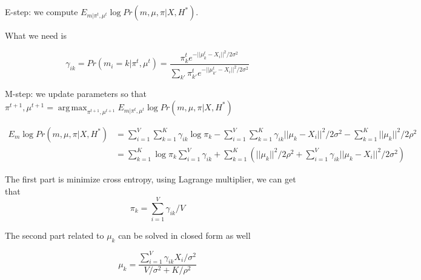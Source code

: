 \documentclass[letterpaper]{article}
\theoremstyle{plain} \numberwithin{equation}{section}
\theoremstyle{definition}
\newcommand{\hyper}{H^*}
\newcommand{\norm}[1]{||#1||^2}
\newcommand{\tsup}[2]{#1^{#2}}
\DeclareMathOperator*{\argmax}{arg\,max}
\begin{document}
E-step: we compute $E_{m|\tsup{\pi}{t}, \tsup{\mu}{t}}\log{Pr(m, \mu, \pi|X, \hyper)}$.

What we need is 

$$\gamma_{ik}=Pr(m_i=k|\tsup{\pi}{t}, \tsup{\mu}{t})=\frac{\tsup{\pi_k}{t}e^{-\norm{\tsup{\mu_k}{t}-X_i}/2\sigma^2}}{\sum_{k'}\tsup{\pi_{k'}}{t}
e^{-\norm{\tsup{\mu_{k'}}{t}-X_i}/2\sigma^2}}$$

M-step: we update parameters so that $\tsup{\pi}{t+1}, \tsup{\mu}{t+1} = \argmax_{\tsup{\pi}{t+1}, \tsup{\mu}{t+1}}E_{m|\tsup{\pi}{t}, \tsup{\mu}{t}}\log{Pr(m, \mu, \pi|X, \hyper)}$

\begin{align}
E_m \log{Pr(m, \mu, \pi|X, \hyper)} &= \sum_{i=1}^V\sum_{k=1}^K \gamma_{ik}\log{\pi_k} - \sum_{i=1}^V\sum_{k=1}^K \gamma_{ik} \norm{\mu_k - X_i}/2\sigma^2 - \sum_{k=1}^K \norm{\mu_k}/2\rho^2 \nonumber \\
&= \sum_{k=1}^K \log{\pi_k} \sum_{i=1}^V \gamma_{ik} + \sum_{k=1}^K (\norm{\mu_k}/2\rho^2 + \sum_{i=1}^V \gamma_{ik}\norm{\mu_k-X_i}/2\sigma^2) \nonumber
\end{align}

The first part is minimize cross entropy, using Lagrange multiplier, we can get that 
$$\pi_k = \sum_{i=1}^V \gamma_{ik}/V$$

The second part related to $\mu_k$ can be solved in closed form as well

$$\mu_k = \frac{\sum_{i=1}^V\gamma_{ik}X_i/\sigma^2}{V/\sigma^2+K/\rho^2}$$
\end{document}
